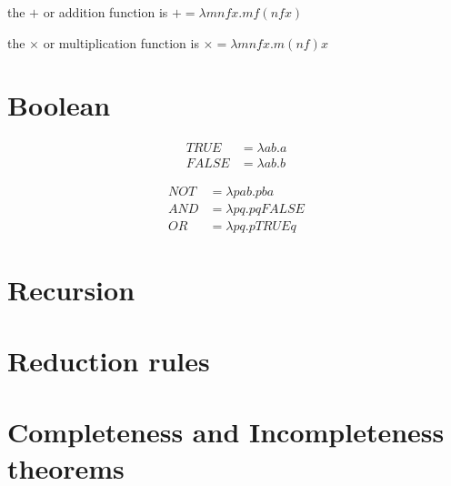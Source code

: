 \documentclass{article}
\begin{document}
the $+$ or addition function is $+ = \lambda mnfx.mf(nfx)$

the $\times$ or multiplication function is $\times = \lambda mnfx. m(nf)x$

\section{Boolean}

\begin{align}
  TRUE  &= \lambda ab.a \\
  FALSE &= \lambda ab.b
\end{align}

\begin{align}
NOT   &= \lambda pab. pba\\
AND   &= \lambda pq. pqFALSE \\
OR    &= \lambda pq. pTRUEq
\end{align}

\section{Recursion}
\section{Reduction rules}
\section{Completeness and Incompleteness theorems}
\end{document}
